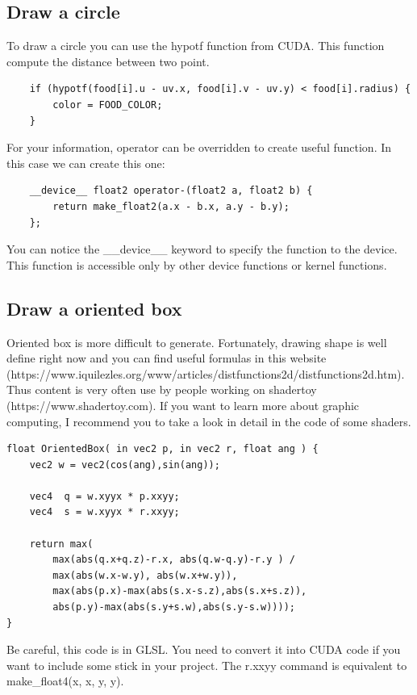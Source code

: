 \documentclass{article}
\begin{document}
\subsection{Draw a circle}
To draw a circle you can use the hypotf function from CUDA. This function compute the distance between two point. 
\begin{lstlisting}
	if (hypotf(food[i].u - uv.x, food[i].v - uv.y) < food[i].radius) {
		color = FOOD_COLOR;
	}
\end{lstlisting}
For your information, operator can be overridden to create useful function. In this case we can create this one:
\begin{lstlisting}
	__device__ float2 operator-(float2 a, float2 b) {
		return make_float2(a.x - b.x, a.y - b.y);
	};
\end{lstlisting}
You can notice the \_\_device\_\_ keyword to specify the function to the device. This function is accessible only by other device functions or kernel functions.

\subsection{Draw a oriented box}
Oriented box is more difficult to generate. Fortunately, drawing shape is well define right now and you can find useful formulas in this website (https://www.iquilezles.org/www/articles/distfunctions2d/distfunctions2d.htm). Thus content is very often use by people working on shadertoy (https://www.shadertoy.com). If you want to learn more about graphic computing, I recommend you to take a look in detail in the code of some shaders.
\begin{lstlisting}
float OrientedBox( in vec2 p, in vec2 r, float ang ) {
    vec2 w = vec2(cos(ang),sin(ang));

    vec4  q = w.xyyx * p.xxyy;
    vec4  s = w.xyyx * r.xxyy;

    return max(
        max(abs(q.x+q.z)-r.x, abs(q.w-q.y)-r.y ) /
        max(abs(w.x-w.y), abs(w.x+w.y)),
        max(abs(p.x)-max(abs(s.x-s.z),abs(s.x+s.z)),
        abs(p.y)-max(abs(s.y+s.w),abs(s.y-s.w))));
}
\end{lstlisting}
Be careful, this code is in GLSL. You need to convert it into CUDA code if you want to include some stick in your project. The r.xxyy command is equivalent to make\_float4(x, x, y, y).
\end{document}
